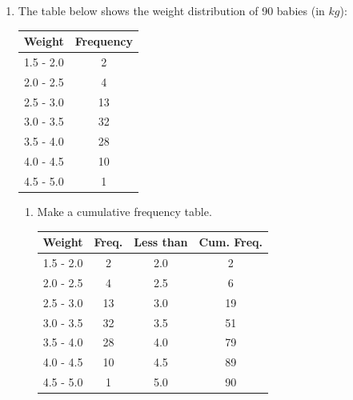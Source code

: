 \documentclass{report}
\begin{document}
\begin{multicols}{2}
\begin{enumerate}
    \item The table below shows the weight distribution of 90 babies (in $kg$):
          \begin{center}
            \begin{tabular}{|c|c|}
              \hline
              Weight    & Frequency \\
              \hline
              1.5 - 2.0 & 2         \\
              2.0 - 2.5 & 4         \\
              2.5 - 3.0 & 13        \\
              3.0 - 3.5 & 32        \\
              3.5 - 4.0 & 28        \\
              4.0 - 4.5 & 10        \\
              4.5 - 5.0 & 1         \\
              \hline
            \end{tabular}
          \end{center}
          \begin{enumerate}
            \item Make a cumulative frequency table. \sol{}
                  \begin{center}
                    \begin{tabular}{|c|c|c|c|}
                      \hline
                      Weight    & Freq. & Less than & Cum. Freq. \\
                      \hline
                      1.5 - 2.0 & 2     & 2.0       & 2          \\
                      2.0 - 2.5 & 4     & 2.5       & 6          \\
                      2.5 - 3.0 & 13    & 3.0       & 19         \\
                      3.0 - 3.5 & 32    & 3.5       & 51         \\
                      3.5 - 4.0 & 28    & 4.0       & 79         \\
                      4.0 - 4.5 & 10    & 4.5       & 89         \\
                      4.5 - 5.0 & 1     & 5.0       & 90         \\
                      \hline
                    \end{tabular}
                  \end{center}


\end{enumerate}
\end{enumerate}
\end{multicols}
\end{document}
